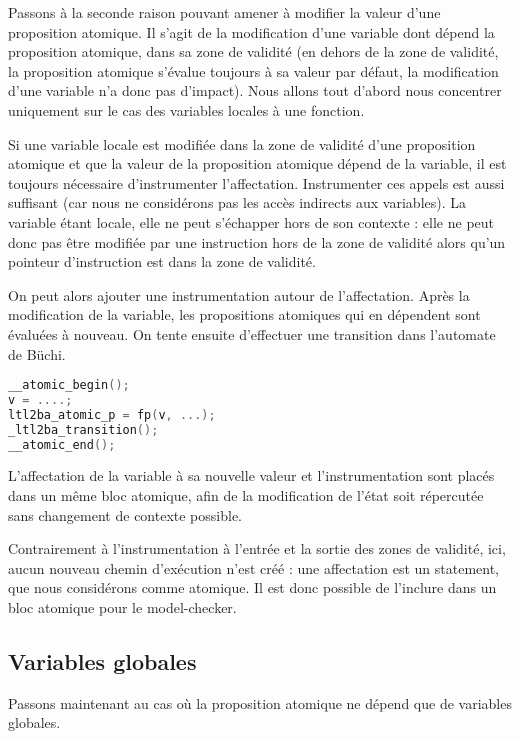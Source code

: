 Passons à la seconde raison pouvant amener à modifier la valeur d'une
proposition atomique. Il s'agit de la modification d'une variable dont
dépend la proposition atomique, dans sa zone de validité (en dehors de
la zone de validité, la proposition atomique s'évalue toujours à sa
valeur par défaut, la modification d'une variable n'a donc pas
d'impact). Nous allons tout d'abord nous concentrer uniquement sur le
cas des variables locales à une fonction.

Si une variable locale est modifiée dans la zone de validité d'une
proposition atomique et que la valeur de la proposition atomique dépend
de la variable, il est toujours nécessaire d'instrumenter l'affectation.
Instrumenter ces appels est aussi suffisant (car nous ne considérons pas
les accès indirects aux variables). La variable étant locale, elle ne
peut s'échapper hors de son contexte : elle ne peut donc pas être
modifiée par une instruction hors de la zone de validité alors qu'un
pointeur d'instruction est dans la zone de validité.

On peut alors ajouter une instrumentation autour de l'affectation. Après
la modification de la variable, les propositions atomiques qui en
dépendent sont évaluées à nouveau. On tente ensuite d'effectuer une
transition dans l'automate de Büchi.

\begin{lstlisting}[language=C, frame=single, caption=Instrumentation pour une
  variable locale]
__atomic_begin();
v = ....;
ltl2ba_atomic_p = fp(v, ...);
_ltl2ba_transition();
__atomic_end();
\end{lstlisting}

L'affectation de la variable à sa nouvelle valeur et l'instrumentation
sont placés dans un même bloc atomique, afin de la modification de
l'état soit répercutée sans changement de contexte possible.

Contrairement à l'instrumentation à l'entrée et la sortie des zones de
validité, ici, aucun nouveau chemin d'exécution n'est créé : une
affectation est un statement, que nous considérons comme atomique. Il
est donc possible de l'inclure dans un bloc atomique pour le
model-checker.

\subsection{Variables globales}

Passons maintenant au cas où la proposition atomique ne dépend que de
variables globales.

